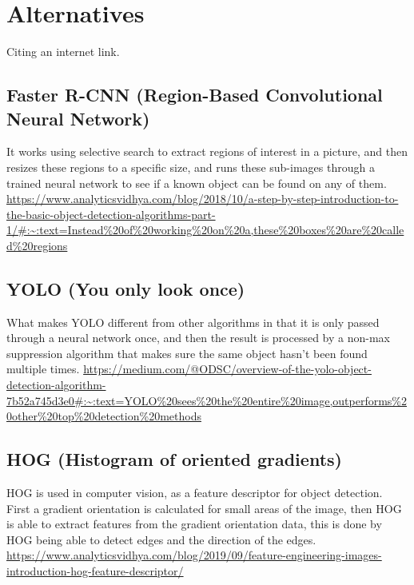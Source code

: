 \section{Alternatives}
Citing an internet link.\cite{Senn:2009}


\subsection{Faster R-CNN (Region-Based Convolutional Neural Network)}
It works using selective search to extract regions of interest in a picture, and then resizes these regions to a specific size, and runs these sub-images through a trained neural network to see if a known object can be found on any of them.
\url{https://www.analyticsvidhya.com/blog/2018/10/a-step-by-step-introduction-to-the-basic-object-detection-algorithms-part-1/#:~:text=Instead%20of%20working%20on%20a,these%20boxes%20are%20called%20regions}

\subsection{YOLO (You only look once)}
What makes YOLO different from other algorithms in that it is only passed through a neural network once, and then the result is processed by a non-max suppression algorithm that makes sure the same object hasn't been found multiple times.
\url{https://medium.com/@ODSC/overview-of-the-yolo-object-detection-algorithm-7b52a745d3e0#:~:text=YOLO%20sees%20the%20entire%20image,outperforms%20other%20top%20detection%20methods}

\subsection{HOG (Histogram of oriented gradients)}
HOG is used in computer vision, as a feature descriptor for object detection. First a gradient orientation is calculated for small areas of the image, then HOG is able to extract features from the gradient orientation data, this is done by HOG being able to detect  edges and the direction of the edges.
\url{https://www.analyticsvidhya.com/blog/2019/09/feature-engineering-images-introduction-hog-feature-descriptor/}